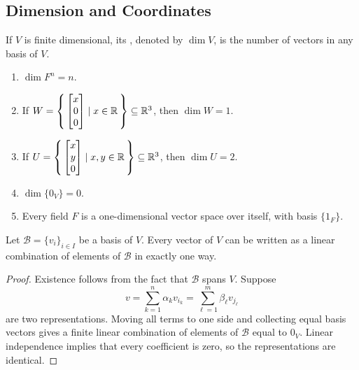 \subsection{Dimension and Coordinates}

\begin{Definition}
If $V$ is finite dimensional, its , denoted by $\dim V$, is the number of vectors in any basis of $V$.
\end{Definition}

\begin{Example}
\begin{enumerate}
\item $\dim F^n=n$.
\item If $W=\qty{\, \begin{bmatrix}x\\0\\0\end{bmatrix} \mid x\in\mathbb R \,}\subseteq\mathbb R^3$, then $\dim W=1$.
\item If $U=\qty{\, \begin{bmatrix}x\\y\\0\end{bmatrix} \mid x,y\in\mathbb R \,}\subseteq\mathbb R^3$, then $\dim U=2$.
\item $\dim\{0_V\}=0$.
\item Every field $F$ is a one-dimensional vector space over itself, with basis $\{1_F\}$.
\end{enumerate}
\end{Example}

\begin{Theorem}\label{thm:Coordinates}
Let $\mathcal B=\{v_i\}_{i\in I}$ be a basis of $V$. Every vector of $V$ can be written as a linear combination of elements of $\mathcal B$ in exactly one way.
\end{Theorem}
\begin{proof}
Existence follows from the fact that $\mathcal B$ spans $V$. Suppose
\begin{equation*}
v=\sum_{k=1}^n\alpha_kv_{i_k}
 =\sum_{\ell=1}^m\beta_\ell v_{j_\ell}
\end{equation*}
are two representations. Moving all terms to one side and collecting equal basis vectors gives a finite linear combination of elements of $\mathcal B$ equal to $0_V$. Linear independence implies that every coefficient is zero, so the representations are identical.
\end{proof}

